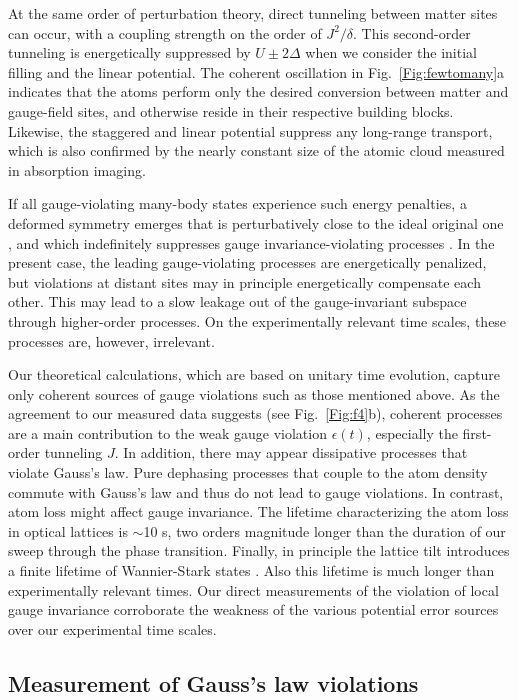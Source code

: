 \documentclass[aps,prl,twocolumn,superscriptaddress,footinbib,linenumbers]{revtex4}
\begin{document}
At the same order of perturbation theory, direct tunneling between matter sites can occur, with a coupling strength on the order of $J^2/\delta$. This second-order tunneling is energetically suppressed by $U \pm 2\Delta$ when we consider the initial filling and the linear potential. The coherent oscillation in Fig.~\ref{Fig:fewtomany}a indicates that the atoms perform only the desired conversion between matter and gauge-field sites, and otherwise reside in their respective building blocks. Likewise, the staggered and linear potential suppress any long-range transport, which is also confirmed by the nearly constant size of the atomic cloud measured in absorption imaging.

If all gauge-violating many-body states experience such energy penalties, a deformed symmetry emerges that is perturbatively close to the ideal original one \cite{Chubb:2017s}, and which indefinitely suppresses gauge invariance-violating processes \cite{Halimeh:2020}. In the present case, the leading gauge-violating processes are energetically penalized, but violations at distant sites may in principle energetically compensate each other. This may lead to a slow leakage out of the gauge-invariant subspace through higher-order processes. On the experimentally relevant time scales, these processes are, however, irrelevant.

Our theoretical calculations, which are based on unitary time evolution, capture only coherent sources of gauge violations such as those mentioned above. As the agreement to our measured data suggests (see Fig.~\ref{Fig:f4}b), coherent processes are a main contribution to the weak gauge violation $\epsilon(t)$,  especially the first-order tunneling $J$.
In addition, there may appear dissipative processes that violate Gauss's law. Pure dephasing processes that couple to the atom density commute with Gauss's law and thus do not lead to gauge violations. In contrast, atom loss might affect gauge invariance. The lifetime characterizing the atom loss in optical lattices is $\sim$10 s, two orders magnitude longer than the duration of our sweep through the phase transition. Finally, in principle the lattice tilt introduces a finite lifetime of Wannier-Stark states \cite{Gluck:2002s}. Also this lifetime is much longer than experimentally relevant times. Our direct measurements of the violation of local gauge invariance corroborate the weakness of the various potential error sources over our experimental time scales.

\subsection{Measurement of Gauss's law violations}
\end{document}
